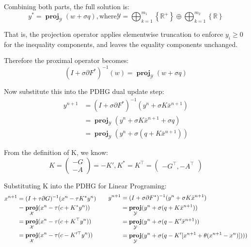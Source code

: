 \documentclass[twoside,12pt,openright]{report}  %
\DeclareMathOperator*{\proj}{\textbf{proj}}
\begin{document}
Combining both parts, the full solution is:
\[
y^* = \proj_{\mathcal{Y} } (w + \sigma q), \text{where} \mathcal{Y} = \displaystyle\bigoplus_{k=1}^{m_1}\left\{\mathbb{R}^+ \right\} \oplus \displaystyle\bigoplus_{k=1}^{m_2}\left\{\mathbb{R} \right\}
\]

That is, the projection operator applies elementwise truncation to enforce \(y_i \ge0\) for the inequality components,  and leaves the equality components unchanged.

Therefore the proximal operator becomes:
\[
(I + \sigma \partial F^*)^{-1}(w) = \proj_{\mathcal{Y} } (w + \sigma q)
\]

Now substitute this into the PDHG dual update step:
\[
\begin{aligned}
    y^{n+1} &= (I + \sigma \partial F^*)^{-1}(y^n+\sigma K \bar{x}^{n+1}) \\
    &= \proj_{\mathcal{Y} }(y^n+\sigma K \bar{x}^{n+1} + \sigma q) \\
    &= \proj_{\mathcal{Y} }(y^n+\sigma(q +  K \bar{x}^{n+1}))
\end{aligned}
\]

From the definition of K, we know:
\[
K = \begin{pmatrix}
    -G \\
    -A
\end{pmatrix} = -K',
K^* = K^\top = \begin{pmatrix}
    -G^\top,-A^\top 
\end{pmatrix}
\]

Substituting K into the PDHG for Linear Programing:
\[
\begin{aligned}
    x^{n+1} &= (I + \tau \partial G)^{-1} (x^n - \tau K^* y^n)\\
    &= \proj_{\mathcal{X}}(x^n-\tau(c+ K^*y^n)) \\
    &= \proj_{\mathcal{X}}(x^n-\tau(c+ K^\top y^n)) \\
    &= \proj_{\mathcal{X}}(x^n-\tau(c- K'^\top y^n))
\end{aligned}\\
\begin{aligned}
    \ \ \ \ \ \ y^{n+1} &= (I + \sigma \partial F^*)^{-1}(y^n+\sigma K \bar{x}^{n+1}) \\
    &= \proj_{\mathcal{Y} }(y^n+\sigma(q +  K \bar{x}^{n+1})) \\
    &= \proj_{\mathcal{Y} }(y^n+\sigma(q -  K' \bar{x}^{n+1})) \\
    &= \proj_{\mathcal{Y} }(y^n+\sigma(q -  K' [x^{n+1}+\theta(x^{n+1}-x^n)])))
\end{aligned}
\]
\end{document}
